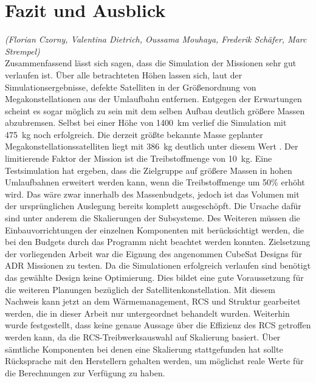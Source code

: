 \chapter{Fazit und Ausblick}
	\hfill\emph{(Florian Czorny, Valentina Dietrich, Oussama Mouhaya, Frederik Schäfer, Marc Strempel)}	\\
Zusammenfassend lässt sich sagen, dass die Simulation der Missionen sehr gut verlaufen ist. Über alle betrachteten Höhen lassen sich, laut der Simulationsergebnisse, defekte Satelliten in der Größenordnung von Megakonstellationen aus der Umlaufbahn entfernen. Entgegen der Erwartungen scheint es sogar möglich zu sein mit dem selben Aufbau deutlich größere Massen abzubremsen. Selbst bei einer Höhe von \SI{1400}{\kilo\metre} verlief die Simulation mit \SI{475}{\kilogram} noch erfolgreich. Die derzeit größte bekannte Masse geplanter Megakonstellationssatelliten liegt mit \SI{386}{\kilogram} deutlich unter diesem Wert \cite{BenLarbi.2017}. Der limitierende Faktor der Mission ist die Treibstoffmenge von \SI{10}{\kilogram}. Eine Testsimulation hat ergeben, dass die Zielgruppe auf größere Massen in hohen Umlaufbahnen erweitert werden kann, wenn die Treibstoffmenge um \num{50}\% erhöht wird. Das wäre zwar innerhalb des Massenbudgets, jedoch ist das Volumen mit der ursprünglichen Auslegung bereits komplett ausgeschöpft. Die Ursache dafür sind unter anderem die Skalierungen der Subsysteme. Des Weiteren müssen die Einbauvorrichtungen der einzelnen Komponenten mit berücksichtigt werden, die bei den Budgets durch das Programm nicht beachtet werden konnten. Zielsetzung der vorliegenden Arbeit war die Eignung des angenommen CubeSat Designs für ADR Missionen zu testen. Da die  Simulationen erfolgreich verlaufen sind benötigt das gewählte Design keine Optimierung. Dies bildet eine gute Voraussetzung für die weiteren Planungen bezüglich der Satellitenkonstellation. Mit diesem Nachweis kann jetzt an dem Wärmemanagement, RCS und Struktur gearbeitet werden, die in dieser Arbeit nur untergeordnet behandelt wurden. Weiterhin wurde festgestellt, dass keine genaue Aussage über die Effizienz des RCS getroffen werden kann, da die RCS-Treibwerksauswahl auf Skalierung basiert. Über sämtliche Komponenten bei denen eine Skalierung stattgefunden hat sollte Rücksprache mit den Herstellern gehalten werden, um möglichst reale Werte für die Berechnungen zur Verfügung zu haben. 
